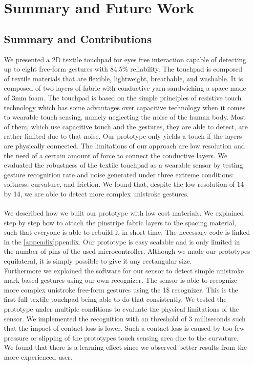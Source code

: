 %

\chapter{Summary and Future Work}
\label{summaryandfuturework}

\section{Summary and Contributions}
\label{summaryandfuturework.summary}
We presented a 2D textile touchpad for eyes free interaction capable of detecting up to eight free-form gestures with 84.5\% reliability. The touchpad is composed of textile materials that are flexible, lightweight, breathable, and washable. It is composed of two layers of fabric with conductive yarn sandwiching a space made of 3mm foam. The touchpad is based on the simple principles of resistive touch technology which has some advantages over capacitive technology when it comes to wearable touch sensing, namely neglecting the noise of the human body. Most of them, which use capacitive touch and the gestures, they are able to detect, are rather limited due to that noise. Our prototype only yields a touch if the layers are physically connected. The limitations of our approach are low resolution and the need of a certain amount of force to connect the conductive layers. We evaluated the robustness of the textile touchpad as a wearable sensor by testing gesture recognition rate and noise generated under three extreme conditions: softness, curvature, and friction. We found that, despite the low resolution of 14 by 14, we are able to detect more complex unistroke gestures.
\\ \\
We described how we built our prototype with low cost materials. We explained step by step how to attach the pinstripe fabric layers to the spacing material, such that everyone is able to rebuild it in short time. The necessary code is linked in the \ref{appendix}ppendix. Our prototype is easy scalable and is only limited in the number of pins of the used microcontroller. Although we made our prototypes equilateral, it is simply possible to give it any rectangular size. 
\\
Furthermore we explained the software for our sensor to detect simple unistroke mark-based gestures using our own recognizer. The sensor is able to recognize more complex unistroke free-form gestures using the 1\$ recognizer. This is the first full textile touchpad being able to do that consistently. We tested the prototype under multiple conditions to evaluate the physical limitations of the sensor. We implemented the recognition with an threshold of 3 milliseconds such that the impact of contact loss is lower. Such a contact loss is caused by too few pressure or slipping of the prototypes touch sensing area due to the curvature. We found that there is a learning effect since we observed better results from the more experienced user. 
